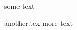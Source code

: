 \documentclass{article}
\begin{document}
some text
\begin{filecontents*}{another.tex}
more text
\end{filecontents*}
\end{document}
